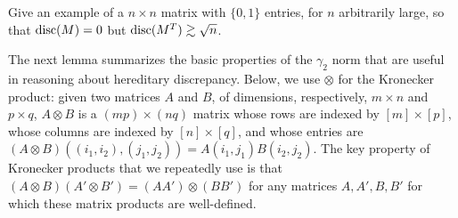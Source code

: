 \begin{exercise}
  Give an example of a $n\times n$ matrix with $\{0,1\}$ entries,
  for $n$ arbitrarily large, so that $\operatorname{disc}(M) = 0$ but
  $\operatorname{disc}(M^T) \gtrsim \sqrt{n}$.
\end{exercise}


The next lemma summarizes the basic properties of the $\gamma_2$ norm
that are useful in reasoning about hereditary
discrepancy. Below, we use $\otimes$ for the Kronecker product: given
two matrices $A$ and $B$, of dimensions, respectively, $m \times n$
and $p \times q$, $A\otimes B$ is a $(mp) \times (nq)$ matrix whose
rows are indexed by $[m]\times [p]$, whose columns are indexed by $[n]\times
[q]$, and whose entries are $(A\otimes B)((i_1, i_2), (j_1, j_2)) =
A(i_1,j_1)B(i_2,j_2)$. The key property of Kronecker products that we
repeatedly use is that $(A\otimes B)(A'\otimes B') =
(AA')\otimes(BB')$ for any matrices $A,A',B,B'$ for which these matrix
products are well-defined.

